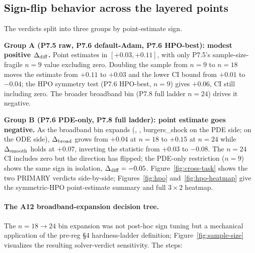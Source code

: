 \subsection{Sign-flip behavior across the layered points}
\label{sec:verdict-signflip}

The verdicts split into three groups by point-estimate sign.

\textbf{Group A (P7.5 raw, P7.6 default-Adam, P7.6 HPO-best):
modest positive $\Delta_{\mathrm{diff}}$.} Point estimates in $[+0.03, +0.11]$, with
only P7.5's sample-size-fragile $n=9$ value excluding zero. Doubling
the sample from $n=9$ to $n=18$ moves the estimate from $+0.11$ to
$+0.03$ and the lower CI bound from $+0.01$ to $-0.04$; the HPO
symmetry test (P7.6 HPO-best, $n=9$) gives $+0.06$, CI still
including zero. The broader broadband bin (P7.8 full ladder $n=24$)
drives it negative.

\textbf{Group B (P7.6 PDE-only, P7.8 full ladder): point estimate
goes negative.} As the broadband bin expands (\fhn{}, \ac{},
burgers\_shock on the PDE side; \fhn{} on the ODE side), $\Delta_{\mathrm{broad}}$
grows from $+0.04$ at $n=18$ to $+0.15$ at $n=24$ while $\Delta_{\mathrm{smooth}}$
holds at $+0.07$, inverting the statistic from $+0.03$ to $-0.08$.
The $n=24$ CI includes zero but the direction has flipped; the
PDE-only restriction ($n=9$) shows the same sign in isolation,
$\Delta_{\mathrm{diff}} = -0.05$. Figure~\ref{fig:cross-task} shows the two PRIMARY
verdicts side-by-side; Figures~\ref{fig:hpo}
and~\ref{fig:hpo-heatmap} give the symmetric-HPO point-estimate
summary and full $3\times 2$ heatmap.

\paragraph{The A12 broadband-expansion decision tree.}
The $n=18 \to 24$ bin expansion was not post-hoc sign tuning but a
mechanical application of the pre-reg \S 4 hardness-ladder definition;
Figure~\ref{fig:sample-size} visualizes the resulting solver-verdict
sensitivity. The steps:

